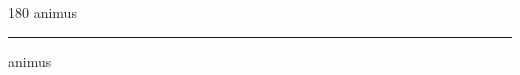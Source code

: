 
\begin{frame}
\begin{center}
\begin{turn}{180}
{\fontsize{2.5cm}{1em}\selectfont animus}
\end{turn}
\vspace{1em}\par  
\hrule
\vspace{1em}\par  
{\fontsize{2.5cm}{1em}\selectfont animus}
\end{center}
\end{frame}
